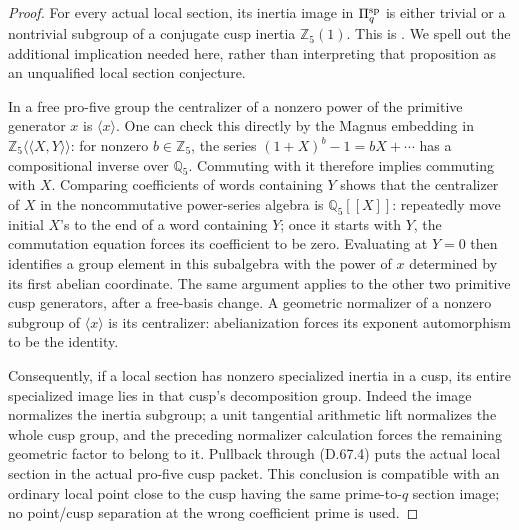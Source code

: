 \begin{proof}
For every actual local section, its inertia image
in \(\Pi_q^{\rm sp}\) is either trivial or a
nontrivial subgroup of a conjugate cusp inertia
\(\mathbb Z_5(1)\). This is
\cite[Proposition A.6, pp.~41--42]{DE_Hoshi2012}.
We spell out the additional implication needed here,
rather than interpreting that proposition as an
unqualified local section conjecture.

In a free pro-five group the centralizer of a
nonzero power of the primitive generator \(x\)
is \(\langle x\rangle\). One can check this
directly by the Magnus embedding in
\(\mathbb Z_5\langle\!\langle X,Y\rangle\!\rangle\):
for nonzero \(b\in\mathbb Z_5\), the series
\((1+X)^b-1=bX+\cdots\) has a compositional inverse
over \(\mathbb Q_5\). Commuting with it therefore
implies commuting with \(X\). Comparing coefficients
of words containing \(Y\) shows that the centralizer
of \(X\) in the noncommutative power-series algebra
is \(\mathbb Q_5[[X]]\): repeatedly move initial
\(X\)'s to the end of a word containing \(Y\);
once it starts with \(Y\), the commutation equation
forces its coefficient to be zero. Evaluating at \(Y=0\)
then identifies a group element in this subalgebra
with the power of \(x\) determined by its first
abelian coordinate. The same argument applies to
the other two primitive cusp generators, after
a free-basis change. A geometric normalizer of a
nonzero subgroup of \(\langle x\rangle\) is its
centralizer: abelianization forces its exponent
automorphism to be the identity.

Consequently, if a local section has nonzero
specialized inertia in a cusp, its entire specialized
image lies in that cusp's decomposition group.
Indeed the image normalizes the inertia subgroup;
a unit tangential arithmetic lift normalizes the
whole cusp group, and the preceding normalizer
calculation forces the remaining geometric factor
to belong to it. Pullback through (D.67.4) puts the
actual local section in the actual pro-five cusp
packet. This conclusion is compatible with an
ordinary local point close to the cusp having the
same prime-to-\(q\) section image; no point/cusp
separation at the wrong coefficient prime is used.


\end{proof}
